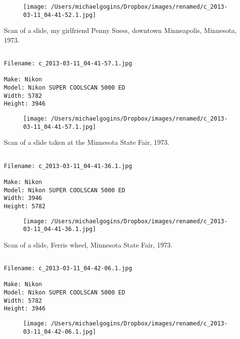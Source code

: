 \begin{figure}
\texttt{[image: /Users/michaelgogins/Dropbox/images/renamed/c\_2013-03-11\_04-41-52.1.jpg]}
\end{figure}
    
\clearpage
\onecolumn
\noindent Scan of a slide, my girlfriend Penny Suess, downtown Minneapolis, Minnesota, 1973.
\noindent
\begin{lstlisting}

Filename: c_2013-03-11_04-41-57.1.jpg

Make: Nikon
Model: Nikon SUPER COOLSCAN 5000 ED
Width: 5782
Height: 3946
\end{lstlisting}
\clearpage

\begin{figure}
\texttt{[image: /Users/michaelgogins/Dropbox/images/renamed/c\_2013-03-11\_04-41-57.1.jpg]}
\end{figure}
    
\clearpage
\onecolumn
\noindent Scan of a slide taken at the Minnesota State Fair, 1973.
\noindent
\begin{lstlisting}

Filename: c_2013-03-11_04-41-36.1.jpg

Make: Nikon
Model: Nikon SUPER COOLSCAN 5000 ED
Width: 3946
Height: 5782
\end{lstlisting}
\clearpage

\begin{figure}
\texttt{[image: /Users/michaelgogins/Dropbox/images/renamed/c\_2013-03-11\_04-41-36.1.jpg]}
\end{figure}
    
\clearpage
\onecolumn
\noindent Scan of a slide, Ferris wheel, Minnesota State Fair, 1973.
\noindent
\begin{lstlisting}

Filename: c_2013-03-11_04-42-06.1.jpg

Make: Nikon
Model: Nikon SUPER COOLSCAN 5000 ED
Width: 5782
Height: 3946
\end{lstlisting}
\clearpage

\begin{figure}
\texttt{[image: /Users/michaelgogins/Dropbox/images/renamed/c\_2013-03-11\_04-42-06.1.jpg]}
\end{figure}
    
